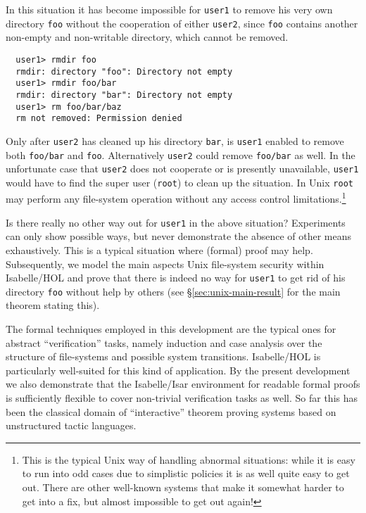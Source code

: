 \documentclass[11pt,a4paper]{article}
\newcommand{\secref}[1]{\S\ref{#1}}
\begin{document}
In this situation it has become impossible for \texttt{user1} to remove his
very own directory \texttt{foo} without the cooperation of either
\texttt{user2}, since \texttt{foo} contains another non-empty and non-writable
directory, which cannot be removed.

{\small
\begin{verbatim}
  user1> rmdir foo
  rmdir: directory "foo": Directory not empty
  user1> rmdir foo/bar
  rmdir: directory "bar": Directory not empty
  user1> rm foo/bar/baz
  rm not removed: Permission denied
\end{verbatim}
}

Only after \texttt{user2} has cleaned up his directory \texttt{bar}, is
\texttt{user1} enabled to remove both \texttt{foo/bar} and \texttt{foo}.
Alternatively \texttt{user2} could remove \texttt{foo/bar} as well.  In the
unfortunate case that \texttt{user2} does not cooperate or is presently
unavailable, \texttt{user1} would have to find the super user (\texttt{root})
to clean up the situation.  In Unix \texttt{root} may perform any file-system
operation without any access control limitations.\footnote{This is the typical
  Unix way of handling abnormal situations: while it is easy to run into odd
  cases due to simplistic policies it is as well quite easy to get out.  There
  are other well-known systems that make it somewhat harder to get into a fix,
  but almost impossible to get out again!}

\bigskip Is there really no other way out for \texttt{user1} in the above
situation?  Experiments can only show possible ways, but never demonstrate the
absence of other means exhaustively.  This is a typical situation where
(formal) proof may help.  Subsequently, we model the main aspects Unix
file-system security within Isabelle/HOL \cite{Nipkow-et-al:2000:HOL} and
prove that there is indeed no way for \texttt{user1} to get rid of his
directory \texttt{foo} without help by others (see
\secref{sec:unix-main-result} for the main theorem stating this).

\medskip The formal techniques employed in this development are the typical
ones for abstract ``verification'' tasks, namely induction and case analysis
over the structure of file-systems and possible system transitions.
Isabelle/HOL \cite{Nipkow-et-al:2000:HOL} is particularly well-suited for this
kind of application.  By the present development we also demonstrate that the
Isabelle/Isar environment \cite{Wenzel:1999:TPHOL,Wenzel:2000:isar-ref} for
readable formal proofs is sufficiently flexible to cover non-trivial
verification tasks as well.  So far this has been the classical domain of
``interactive'' theorem proving systems based on unstructured tactic
languages.






\end{document}
